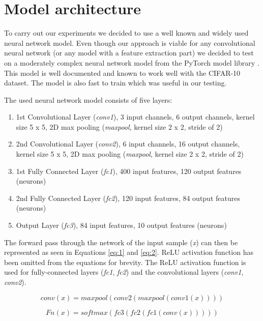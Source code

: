 \documentclass[b5paper]{book}
\let\cite\parencite
\begin{document}
\section{Model architecture}
\label{modelarch}

To carry out our experiments we decided to use a well known and widely used neural network model. Even though our approach is viable for any convolutional neural network (or any model with a feature extraction part) we decided to test on a moderately complex neural network model from the PyTorch model library \cite{paszke2017automatic,paszke2017pytorch}. This model is well documented and known to work well with the CIFAR-10 dataset. The model is also fast to train which was useful in our testing. 

The used neural network model consists of five layers:

\begin{enumerate}
    \item 1st Convolutional Layer (\emph{conv1}), 3 input channels, 6 output channels, kernel size 5 x 5, 2D max pooling (\emph{maxpool}, kernel size 2 x 2, stride of 2)
    \item 2nd Convolutional Layer (\emph{conv2}), 6 input channels, 16 output channels, kernel size 5 x 5, 2D max pooling (\emph{maxpool}, kernel size 2 x 2, stride of 2)
    \item 1st Fully Connected Layer (\emph{fc1}), 400 input features, 120 output features (neurons)
    \item 2nd Fully Connected Layer (\emph{fc2}), 120 input features, 84 output features (neurons)
    \item Output Layer (\emph{fc3}), 84 input features, 10 output features (neurons)
\end{enumerate}

The forward pass through the network of the input sample (\emph{x}) can then be represented as seen in Equations \ref{eq:1} and \ref{eq:2}. ReLU activation function has been omitted from the equations for brevity. The ReLU activation function is used for fully-connected layers (\emph{fc1}, \emph{fc2}) and the convolutional layers (\emph{conv1}, \emph{conv2}).

\begin{equation}\label{eq:1}
conv(x) = maxpool(conv2(maxpool(conv1(x))))
\end{equation}

\begin{equation}\label{eq:2}
Fn(x) = softmax(fc3(fc2(fc1(conv(x)))))
\end{equation}
\end{document}
